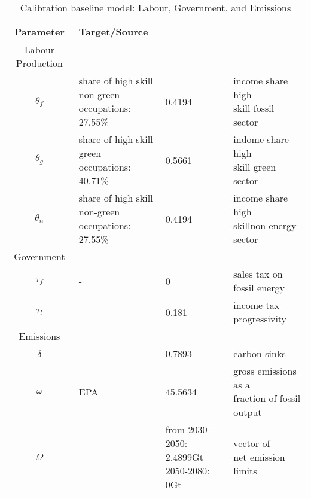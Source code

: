  \begin{table}[hh!!!!!]
 	\begin{center}
 		\captionsetup{width=0.9\textwidth}
 		\caption{ Calibration baseline model: Labour, Government, and Emissions}
 		\label{tab:calib2}
 		\begin{tabular}{c|lll}
 			\hline \hline
 			Parameter& Target/Source& \makecell[l]{Calibration}& \makecell[l]{Meaning}\\ 
 			\hline
 			\hline
 			Labour Production&\multicolumn{3}{c}{}\\
 			\hline 
 			
 			\hline
 			$\theta_f$&\makecell[l]{share of high skill\\ non-green occupations: \\27.55\% }&0.4194&\makecell[l]{income share high \\ skill fossil sector}\\
 			\hline
 			$\theta_g$&\makecell[l]{share of high skill\\ green occupations: \\40.71\% }&0.5661&\makecell[l]{indome share high \\skill green sector}\\
 			\hline
 			$\theta_n$&\makecell[l]{share of high skill\\ non-green occupations: \\27.55\% }&0.4194&\makecell[l]{income share high \\ skillnon-energy sector}\\
 			\hline
 			\hline
 			Government&\multicolumn{3}{c}{}\\
 			\hline
 			
 			\hline
 			$\tau_f$&- &0& sales tax on fossil energy\\
 			\hline
 			$\tau_l$&\cite{Heathcote2017OptimalFramework} &0.181& income tax progressivity\\
 			\hline	
 			\hline
 			Emissions&\multicolumn{3}{c}{}\\
 			\hline
 			
 			\hline
 			$\delta$& \makecell[l]{EPA}&0.7893&carbon sinks \\
 			\hline
 			$\omega$& EPA&45.5634& \makecell[l]{ gross emissions as a\\ fraction of fossil output}\\
 			\hline
 			$\Omega$& \cite{IPCC2022}&\makecell[l]{from 2030-2050: 2.4899Gt\\2050-2080: 0Gt}& \makecell[l]{vector of \\ net emission limits}\\
 			\hline \hline
 		\end{tabular}
 	\end{center}
 \end{table}
